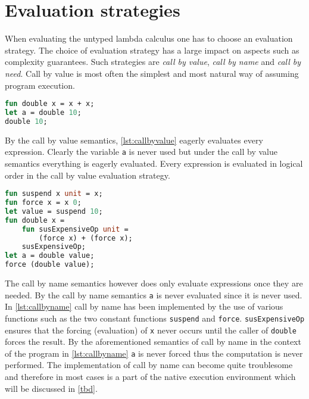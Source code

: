 \documentclass[11pt,oneside,a4paper]{report}
\begin{document}
\section{Evaluation strategies}
\label{sec:es}
When evaluating the untyped lambda calculus one has to choose an evaluation strategy.
The choice of evaluation strategy has a large impact on aspects such as complexity guarantees.
Such strategies are \textit{call by value}, \textit{call by name} and \textit{call by need}.
Call by value is most often the simplest and most natural way of assuming program execution.
\begin{lstlisting}[language=ML,caption={Program that doubles values},label={lst:callbyvalue},mathescape=true]
fun double x = x + x;
let a = double 10;
double 10;
\end{lstlisting}
By the call by value semantics, \autoref{lst:callbyvalue} eagerly evaluates every expression.
Clearly the variable \texttt{a} is never used but under the call by value semantics everything is eagerly evaluated.
Every expression is evaluated in logical order in the call by value evaluation strategy.
\newline
\begin{minipage}{\textwidth}
\begin{lstlisting}[language=ML,caption={Implementation of call by name},label={lst:callbyname},mathescape=true]
fun suspend x unit = x;
fun force x = x 0;
let value = suspend 10;
fun double x = 
    fun susExpensiveOp unit = 
        (force x) + (force x);
    susExpensiveOp;
let a = double value;
force (double value);
\end{lstlisting}
\end{minipage}
The call by name semantics however does only evaluate expressions once they are needed.
By the call by name semantics \texttt{a} is never evaluated since it is never used.
In \autoref{lst:callbyname} call by name has been implemented by the use of various functions such as the two constant functions \texttt{suspend} and \texttt{force}.
\texttt{susExpensiveOp} ensures that the forcing (evaluation) of \texttt{x} never occurs until the caller of \texttt{double} forces the result.
By the aforementioned semantics of call by name in the context of the program in \autoref{lst:callbyname} \texttt{a} is never forced thus the computation is never performed.
The implementation of call by name can become quite troublesome and therefore in most cases is a part of the native execution environment which will be discussed in \autoref{tbd}.
\end{document}

